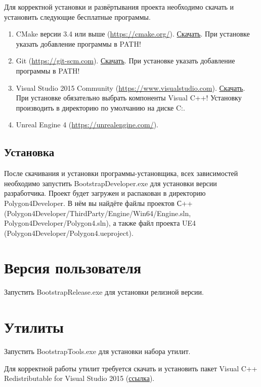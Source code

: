\documentclass[a4paper,12pt]{report}
\newcommand{\ue}{UE4\xspace}
\begin{document}
Для корректной установки и развёртывания проекта необходимо скачать и установить следующие бесплатные программы.

\begin{enumerate}
\item CMake версии 3.4 или выше (\url{https://cmake.org/}).  \href{https://cmake.org/files/v3.4/cmake-3.4.0-win32-x86.exe}{Скачать}. При установке указать добавление программы в PATH!
\item Git (\url{https://git-scm.com}). \href{https://git-scm.com/download/win}{Скачать}. При установке указать добавление программы в PATH!
\item Visual Studio 2015 Community (\url{https://www.visualstudio.com}). \href{https://go.microsoft.com/fwlink/?LinkId=691978}{Скачать}. При установке обязательно выбрать компоненты Visual C++! Установку производить в директорию по умолчанию на диске C:.
\item Unreal Engine 4 (\url{https://unrealengine.com/}).
\end{enumerate}

\subsection{Установка}

После скачивания и установки программы-установщика, всех зависимостей необходимо запустить BootstrapDeveloper.exe для установки версии разработчика.
Проект будет загружен и распакован в директорию \\Polygon4Developer.
В нём вы найдёте файлы проектов С++ \\(Polygon4Developer/ThirdParty/Engine/Win64/Engine.sln,\\ Polygon4Developer/Polygon4.sln), а также файл проекта \ue\\ (Polygon4Developer/Polygon4.ueproject).


\section{Версия пользователя}

Запустить BootstrapRelease.exe для установки релизной версии.

\section{Утилиты}

Запустить BootstrapTools.exe для установки набора утилит.

Для корректной работы утилит требуется скачать и установить пакет Visual C++ Redistributable for Visual Studio 2015 (\href{https://download.microsoft.com/download/9/3/F/93FCF1E7-E6A4-478B-96E7-D4B285925B00/vc_redist.x86.exe}{ссылка}).
\end{document}
